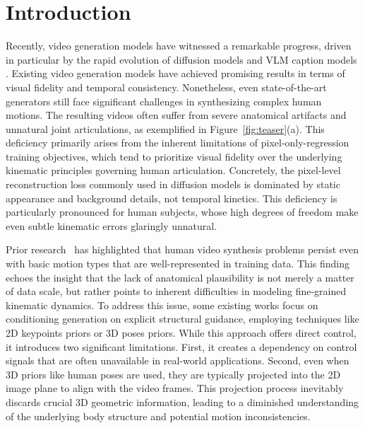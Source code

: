 \section{Introduction}

Recently, video generation models have witnessed a remarkable progress, driven in particular by the rapid evolution of diffusion models \citep{ho2020denoising, song2020denoising, peebles2023scalable, rombach2022high} and VLM caption models \citep{liu2023visual, wang2024qwen2, team2024gemini}. 
Existing video generation models \citep{hong2022cogvideo, wan2025wan, kong2024hunyuanvideo, lin2024open} have achieved promising results in terms of visual fidelity and temporal consistency. 
Nonetheless, even state-of-the-art generators still face significant challenges in synthesizing complex human motions. The resulting videos often suffer from severe anatomical artifacts and unnatural joint articulations, as exemplified in Figure~\ref{fig:teaser}(a).
This deficiency primarily arises from the inherent limitations of pixel-only-regression training objectives, which tend to prioritize visual fidelity over the underlying kinematic principles governing human articulation. 
Concretely, the pixel-level reconstruction loss commonly used in diffusion models is dominated by static appearance and background details, not temporal kinetics. This deficiency is particularly pronounced for human subjects, whose high degrees of freedom make even subtle kinematic errors glaringly unnatural.



Prior research~\citep{chefer2025videojam, huang2024vbench} has
highlighted that human video synthesis problems persist even with basic motion types that are well-represented in training data. This finding echoes the insight that the lack of anatomical plausibility is not merely a matter of data scale, but rather points to inherent difficulties in modeling fine-grained kinematic dynamics. To address this issue, some existing works focus on conditioning generation on explicit structural guidance, employing techniques like 2D keypoints priors\citep{jiang2025vace,ma2024follow} or 3D poses priors\citep{zhou2024realisdance, buchheim2025controlling}. 
While this approach offers direct control, it introduces two significant limitations. First, it creates a dependency on control signals that are often unavailable in real-world applications. Second, even when 3D priors like human poses are used, they are typically projected into the 2D image plane to align with the video frames. This projection process inevitably discards crucial 3D geometric information, leading to a diminished understanding of the underlying body structure and potential motion inconsistencies.

